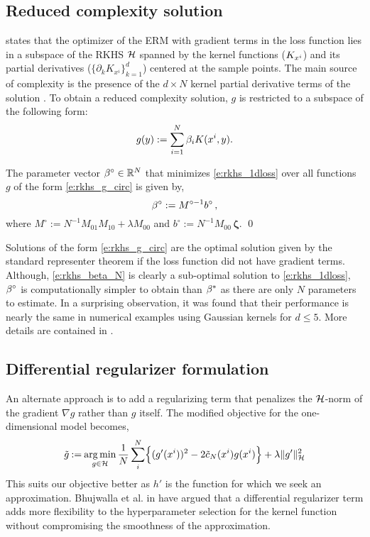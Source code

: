 \subsection{Reduced complexity solution}
 states that the optimizer of the ERM with gradient terms in the loss function lies in a subspace of the RKHS ${\cal H}$ spanned by the kernel functions ($K_{x^i}$) and its partial derivatives ($\{\partial_k K_{x^i}\}_{k=1}^d$) centered at the sample points. The main source of complexity is the presence of the $d \times N$ kernel partial derivative terms of the solution . To obtain a reduced complexity solution, $g$ is restricted to a subspace of the following form:
\begin{equation}
g(y)  := \sum_{i=1}^N \rkhsparam_i K(x^i,y).
\label{e:rkhs_g_circ}
\end{equation}
\begin{proposition}
	\label{t:bcirc}
	The parameter vector $\beta^\circ \in \mathbb{R}^N$ that minimizes \eqref{e:rkhs_1dloss}  over all functions $g$ of the form \eqref{e:rkhs_g_circ} is given by,
	\begin{equation}
	\rkhsparam^\circ  := M^{\circ -1} b^\circ   \,,
	\label{e:rkhs_beta_N}
	\end{equation}
	where $ M^\circ := N^{-1} M_{01} M_{10} + \lambda M_{00}$ and $ b^\circ := N^{-1} M_{00} \, \boldsymbol{\zeta} $.
	\qed
\end{proposition}
Solutions of the form \eqref{e:rkhs_g_circ} are the optimal solution given by the standard representer theorem if the loss function did not have gradient terms. 
Although, \eqref{e:rkhs_beta_N} is clearly a sub-optimal solution to \eqref{e:rkhs_1dloss}, $\beta^\circ$  is computationally simpler to obtain than $\beta^*$ as there are only $N$ parameters to estimate. In a surprising observation, it was found that their performance is nearly the same in numerical examples using Gaussian kernels for $d \leq 5$. More details are contained in .

\subsection{Differential regularizer formulation}
\label{s:diffReg} 

An alternate approach is to add a regularizing term that penalizes the ${\cal H}$-norm of the gradient $\nabla g$ rather than $g$ itself. The modified objective for the one-dimensional model becomes,
\begin{equation}
\tilg \eqdef \argmin_{g\in\clH} \frac{1}{N} \sum_{i}^N \Bigl\{ (g'(x^i))^2 - 2 \tilc_N(x^i) g(x^i)  \Bigr\} + \lambda \|g'\|_\clH^2
\label{e:rkhs_1dloss_diff}
\end{equation}
This suits our objective better as $h'$ is the function for which we seek an approximation. Bhujwalla et al. in \cite{bhujlaugil} have argued that a differential regularizer term adds more flexibility to the hyperparameter selection for the kernel function without compromising the smoothness of the approximation.


